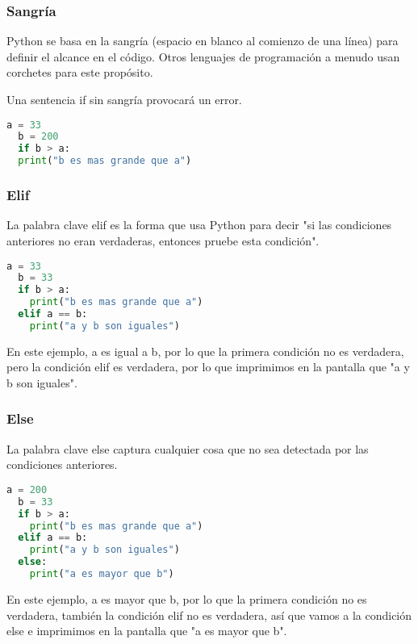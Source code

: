 \begin{frame}[fragile]
  \frametitle{Sangría}

  Python se basa en la sangría (espacio en blanco al comienzo de una línea)
  para definir el alcance en el código. Otros lenguajes de programación a
  menudo usan corchetes para este propósito.

  \pausa
  \vspace{\baselineskip}
  \begin{alertblock}{}
    Una sentencia if sin sangría provocará un error.
  \end{alertblock}

  \vspace{\baselineskip}
  \begin{lstlisting}[language=Python]
  a = 33
  b = 200
  if b > a:
  print("b es mas grande que a")
  \end{lstlisting}
\end{frame}

\begin{frame}[fragile]
  \frametitle{Elif}

  La palabra clave \textcolor{codeKeyword}{elif} es la forma que usa Python
  para decir "si las condiciones anteriores no eran verdaderas, entonces
  pruebe esta condición".

  \vspace{\baselineskip}
  \begin{lstlisting}[language=Python]
  a = 33
  b = 33
  if b > a:
    print("b es mas grande que a")
  elif a == b:
    print("a y b son iguales")
  \end{lstlisting}

  En este ejemplo, a es igual a b, por lo que la primera condición no es
  verdadera, pero la condición elif es verdadera, por lo que imprimimos en
  la pantalla que "a y b son iguales".
\end{frame}

\begin{frame}[fragile]
  \frametitle{Else}

  La palabra clave \textcolor{codeKeyword}{else} captura cualquier cosa que
  no sea detectada por las condiciones anteriores.

  \vspace{\baselineskip}
  \begin{lstlisting}[language=Python]
  a = 200
  b = 33
  if b > a:
    print("b es mas grande que a")
  elif a == b:
    print("a y b son iguales")
  else:
    print("a es mayor que b")
  \end{lstlisting}

  En este ejemplo, a es mayor que b, por lo que la primera condición no es
  verdadera, también la condición elif no es verdadera, así que vamos a la
  condición else e imprimimos en la pantalla que "a es mayor que b". 
\end{frame}

